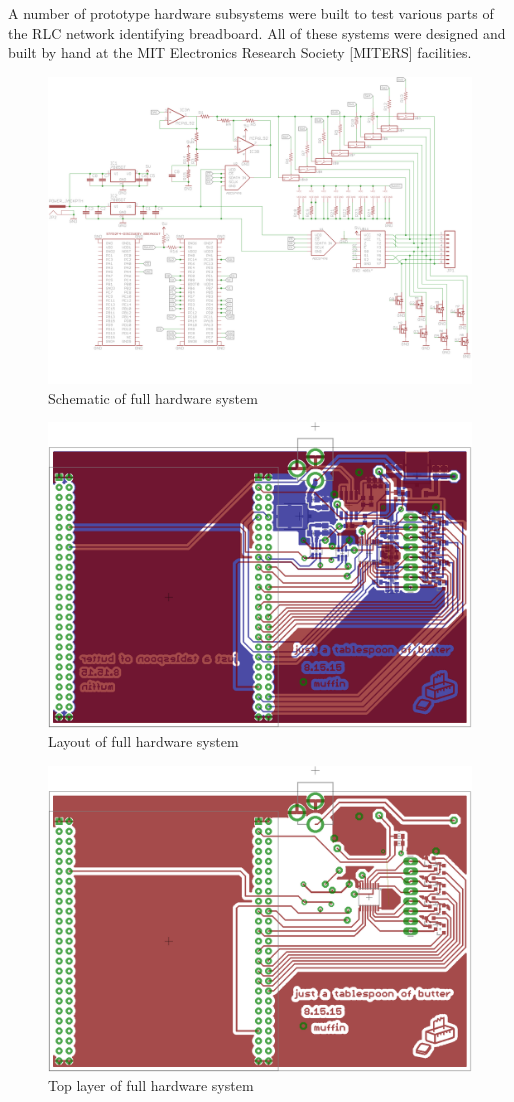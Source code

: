 \documentclass[11pt,twoside]{mitthesis}
\begin{document}
A number of prototype hardware subsystems were built to test various parts of the RLC network identifying breadboard.
All of these systems were designed and built by hand at the MIT Electronics Research Society [MITERS] facilities.

\begin{figure}[h]
  \begin{center}
      \includegraphics[width=1.3\textwidth, angle =90]{../schem1.png}
      \caption{Schematic of full hardware system}
  \end{center}
\end{figure}

\begin{figure}[h]
  \begin{center}
      \includegraphics[width=.55\textwidth]{../layout-tb.png}
      \caption{Layout of full hardware system}
  \end{center}
\end{figure}

\begin{figure}[h]
  \begin{center}
      \includegraphics[width=.55\textwidth]{../layout-t.png}
      \caption{Top layer of full hardware system}
  \end{center}
\end{figure}
\end{document}

